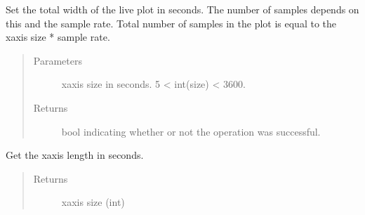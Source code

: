 \documentclass[letterpaper,10pt,english]{sphinxmanual}
\begin{document}

\begin{fulllineitems}
\label{\detokenize{settings_interface:settings_interface.set_x_axis_size}}
Set the total width of the live plot in seconds. The number of samples depends on this and the sample rate.
Total number of samples in the plot is equal to the x\sphinxhyphen{}axis size * sample rate.
\begin{quote}\begin{description}
\item[{Parameters}] \leavevmode
{} \textendash{} x\sphinxhyphen{}axis size in seconds. 5 \textless{} int(size) \textless{} 3600.

\item[{Returns}] \leavevmode
bool indicating whether or not the operation was successful.

\end{description}\end{quote}

\end{fulllineitems}


\begin{fulllineitems}
\label{\detokenize{settings_interface:settings_interface.get_x_axis_size}}
Get the x\sphinxhyphen{}axis length in seconds.
\begin{quote}\begin{description}
\item[{Returns}] \leavevmode
x\sphinxhyphen{}axis size (int)

\end{description}\end{quote}

\end{fulllineitems}

\end{document}
